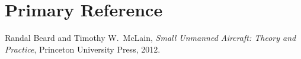 \documentclass[11pt,a4paper]{article}
\begin{document}
\section*{Primary Reference}
Randal Beard and Timothy W.\ McLain, \emph{Small Unmanned Aircraft: Theory and Practice}, Princeton University Press, 2012.
\end{document}
